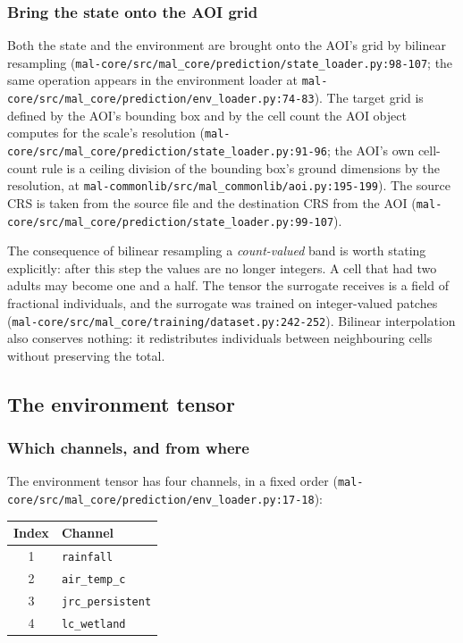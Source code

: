 \documentclass[11pt,a4paper]{article}
\newcommand{\code}[1]{\texttt{#1}}
\begin{document}
\subsubsection{Bring the state onto the AOI grid}

Both the state and the environment are brought onto the AOI's grid by
bilinear resampling (\code{mal-core/src/mal\_core/prediction/state\_loader.py:98-107};
the same operation appears in the environment loader at
\code{mal-core/src/mal\_core/prediction/env\_loader.py:74-83}). The target
grid is defined by the AOI's bounding box and by the cell count the AOI
object computes for the scale's resolution
(\code{mal-core/src/mal\_core/prediction/state\_loader.py:91-96}; the AOI's
own cell-count rule is a ceiling division of the bounding box's ground
dimensions by the resolution, at
\code{mal-commonlib/src/mal\_commonlib/aoi.py:195-199}). The source CRS is
taken from the source file and the destination CRS from the AOI
(\code{mal-core/src/mal\_core/prediction/state\_loader.py:99-107}).

The consequence of bilinear resampling a \emph{count-valued} band is worth
stating explicitly: after this step the values are no longer integers. A
cell that had two adults may become one and a half. The tensor the surrogate
receives is a field of fractional individuals, and the surrogate was trained
on integer-valued patches
(\code{mal-core/src/mal\_core/training/dataset.py:242-252}). Bilinear
interpolation also conserves nothing: it redistributes individuals between
neighbouring cells without preserving the total.

\subsection{The environment tensor}

\subsubsection{Which channels, and from where}

The environment tensor has four channels, in a fixed order
(\code{mal-core/src/mal\_core/prediction/env\_loader.py:17-18}):

\begin{center}
\begin{tabular}{@{}cl@{}}
\toprule
Index & Channel \\
\midrule
1 & \code{rainfall} \\
2 & \code{air\_temp\_c} \\
3 & \code{jrc\_persistent} \\
4 & \code{lc\_wetland} \\
\bottomrule
\end{tabular}
\end{center}
\end{document}
